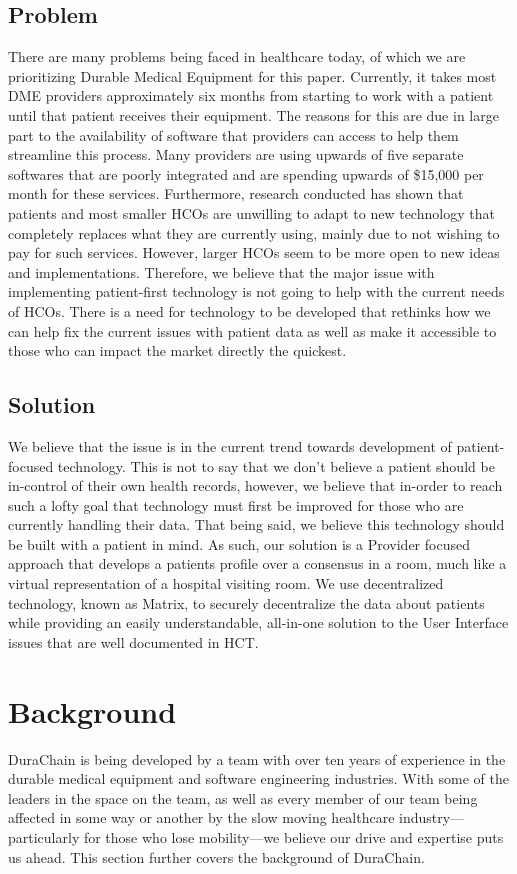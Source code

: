 \documentclass[12pt]{article}
\begin{document}
  \subsection{Problem}
  There are many problems being faced in healthcare today, of which we are prioritizing Durable Medical Equipment for this paper. Currently, it takes most DME providers approximately six months from starting to work with a patient until that patient receives their equipment. The reasons for this are due in large part to the availability of software that providers can access to help them streamline this process. Many providers are using upwards of five separate softwares that are poorly integrated and are spending upwards of \$15,000 per month for these services. Furthermore, research conducted has shown that patients and most smaller HCOs are unwilling to adapt to new technology that completely replaces what they are currently using, mainly due to not wishing to pay for such services. However, larger HCOs seem to be more open to new ideas and implementations. Therefore, we believe that the major issue with implementing patient-first technology is not going to help with the current needs of HCOs. There is a need for technology to be developed that rethinks how we can help fix the current issues with patient data as well as make it accessible to those who can impact the market directly the quickest.

  \subsection{Solution}
  We believe that the issue is in the current trend towards development of patient-focused technology. This is not to say that we don’t believe a patient should be in-control of their own health records, however, we believe that in-order to reach such a lofty goal that technology must first be improved for those who are currently handling their data. That being said, we believe this technology should be built with a patient in mind. As such, our solution is a Provider focused approach that develops a patients profile over a consensus in a room, much like a virtual representation of a hospital visiting room. We use decentralized technology, known as Matrix, to securely decentralize the data about patients while providing an easily understandable, all-in-one solution to the User Interface issues that are well documented in HCT.

\section{Background}
DuraChain is being developed by a team with over ten years of experience in the durable medical equipment and software engineering industries. With some of the leaders in the space on the team, as well as every member of our team being affected in some way or another by the slow moving healthcare industry---particularly for those who lose mobility---we believe our drive and expertise puts us ahead. This section further covers the background of DuraChain.
\end{document}
